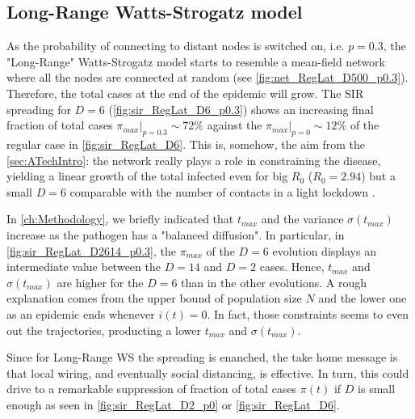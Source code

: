 \documentclass[a4paper,10pt,twoside]{book} %
\theoremstyle{definition}
\begin{document}
\clearpage
\subsection*{Long-Range Watts-Strogatz model}
\label{sec:res_RegLat_p0.3}
As the probability of connecting to distant nodes is switched on, i.e. $p = 0.3$, the "Long-Range" Watts-Strogatz model starts to resemble a mean-field network where all the nodes are connected at random (see \autoref{fig:net_RegLat_D500_p0.3}). Therefore, the total cases at the end of the epidemic will grow.
The SIR spreading for $ D = 6$ (\autoref{fig:sir_RegLat_D6_p0.3}) shows an increasing final fraction of total cases $\pi_{max}|_{p=0.3} \sim 72\%$ against the $\pi_{max}|_{p=0} \sim 12\%$ of the regular case in \autoref{fig:sir_RegLat_D6}. This is, somehow, the aim from the \autoref{sec:ATechIntro}: the network really plays a role in constraining the disease, yielding a linear growth of the total infected even for big $R_0$ ($R_0 = 2.94$) but a small $ D=6$ comparable with the number of contacts in a light lockdown \cite{Liu::2021_Review_SContactPattern}.

In \autoref{ch:Methodology}, we briefly indicated that $t_{max}$ and the variance $ \sigma(t_{max})$ increase as the pathogen has a "balanced diffusion". In particular, in \autoref{fig:sir_RegLat_D2614_p0.3}, the $ \pi_{max} $ of the $ D = 6$ evolution displays an intermediate value between the $ D = 14$ and $ D = 2$ cases. Hence, $t_{max}$ and $ \sigma(t_{max})$ are higher for the $ D =6$ than in the other evolutions. A rough explanation comes from the upper bound of population size $N$ and the lower one as an epidemic ends whenever $ i(t) = 0$. In fact, those constraints seems to even out the trajectories, producting a lower $t_{max}$ and $ \sigma(t_{max})$.

Since for Long-Range WS the spreading is enanched, the take home message is that local wiring, and eventually social distancing, is effective. In turn, this could drive to a remarkable suppression of fraction of total cases $ \pi(t)$ if $ D$ is small enough as seen in \autoref{fig:sir_RegLat_D2_p0} or \autoref{fig:sir_RegLat_D6}.
\end{document}
